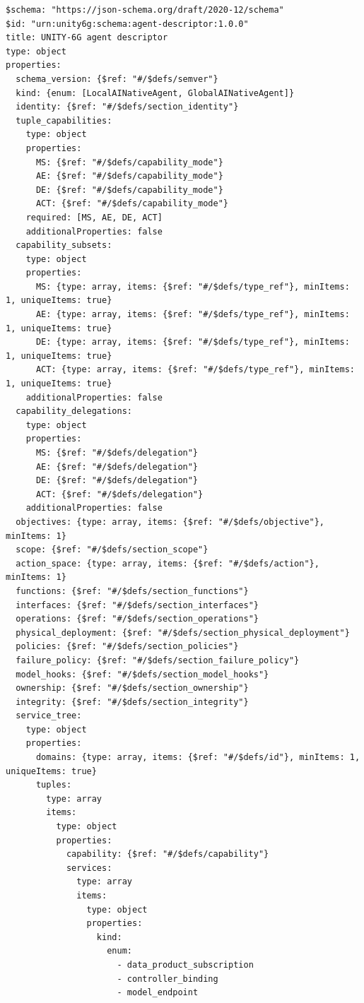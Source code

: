 \begin{verbatim}
$schema: "https://json-schema.org/draft/2020-12/schema"
$id: "urn:unity6g:schema:agent-descriptor:1.0.0"
title: UNITY-6G agent descriptor
type: object
properties:
  schema_version: {$ref: "#/$defs/semver"}
  kind: {enum: [LocalAINativeAgent, GlobalAINativeAgent]}
  identity: {$ref: "#/$defs/section_identity"}
  tuple_capabilities:
    type: object
    properties:
      MS: {$ref: "#/$defs/capability_mode"}
      AE: {$ref: "#/$defs/capability_mode"}
      DE: {$ref: "#/$defs/capability_mode"}
      ACT: {$ref: "#/$defs/capability_mode"}
    required: [MS, AE, DE, ACT]
    additionalProperties: false
  capability_subsets:
    type: object
    properties:
      MS: {type: array, items: {$ref: "#/$defs/type_ref"}, minItems: 1, uniqueItems: true}
      AE: {type: array, items: {$ref: "#/$defs/type_ref"}, minItems: 1, uniqueItems: true}
      DE: {type: array, items: {$ref: "#/$defs/type_ref"}, minItems: 1, uniqueItems: true}
      ACT: {type: array, items: {$ref: "#/$defs/type_ref"}, minItems: 1, uniqueItems: true}
    additionalProperties: false
  capability_delegations:
    type: object
    properties:
      MS: {$ref: "#/$defs/delegation"}
      AE: {$ref: "#/$defs/delegation"}
      DE: {$ref: "#/$defs/delegation"}
      ACT: {$ref: "#/$defs/delegation"}
    additionalProperties: false
  objectives: {type: array, items: {$ref: "#/$defs/objective"}, minItems: 1}
  scope: {$ref: "#/$defs/section_scope"}
  action_space: {type: array, items: {$ref: "#/$defs/action"}, minItems: 1}
  functions: {$ref: "#/$defs/section_functions"}
  interfaces: {$ref: "#/$defs/section_interfaces"}
  operations: {$ref: "#/$defs/section_operations"}
  physical_deployment: {$ref: "#/$defs/section_physical_deployment"}
  policies: {$ref: "#/$defs/section_policies"}
  failure_policy: {$ref: "#/$defs/section_failure_policy"}
  model_hooks: {$ref: "#/$defs/section_model_hooks"}
  ownership: {$ref: "#/$defs/section_ownership"}
  integrity: {$ref: "#/$defs/section_integrity"}
  service_tree:
    type: object
    properties:
      domains: {type: array, items: {$ref: "#/$defs/id"}, minItems: 1, uniqueItems: true}
      tuples:
        type: array
        items:
          type: object
          properties:
            capability: {$ref: "#/$defs/capability"}
            services:
              type: array
              items:
                type: object
                properties:
                  kind:
                    enum:
                      - data_product_subscription
                      - controller_binding
                      - model_endpoint

\end{verbatim}
